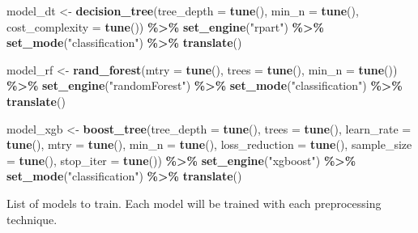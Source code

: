 \documentclass[
]{article}
\newenvironment{Shaded}{\begin{snugshade}}{\end{snugshade}}
\newcommand{\AttributeTok}[1]{\textcolor[rgb]{0.13,0.29,0.53}{#1}}
\newcommand{\FunctionTok}[1]{\textcolor[rgb]{0.13,0.29,0.53}{\textbf{#1}}}
\newcommand{\NormalTok}[1]{#1}
\newcommand{\OtherTok}[1]{\textcolor[rgb]{0.56,0.35,0.01}{#1}}
\newcommand{\SpecialCharTok}[1]{\textcolor[rgb]{0.81,0.36,0.00}{\textbf{#1}}}
\newcommand{\StringTok}[1]{\textcolor[rgb]{0.31,0.60,0.02}{#1}}
\begin{document}
\begin{Shaded}
\begin{Highlighting}[]
\NormalTok{model\_dt }\OtherTok{\textless{}{-}} \FunctionTok{decision\_tree}\NormalTok{(}\AttributeTok{tree\_depth =} \FunctionTok{tune}\NormalTok{(), }\AttributeTok{min\_n =} \FunctionTok{tune}\NormalTok{(), }\AttributeTok{cost\_complexity =} \FunctionTok{tune}\NormalTok{()) }\SpecialCharTok{\%\textgreater{}\%}
  \FunctionTok{set\_engine}\NormalTok{(}\StringTok{"rpart"}\NormalTok{) }\SpecialCharTok{\%\textgreater{}\%}
  \FunctionTok{set\_mode}\NormalTok{(}\StringTok{"classification"}\NormalTok{) }\SpecialCharTok{\%\textgreater{}\%}
  \FunctionTok{translate}\NormalTok{()}

\NormalTok{model\_rf }\OtherTok{\textless{}{-}} \FunctionTok{rand\_forest}\NormalTok{(}\AttributeTok{mtry =} \FunctionTok{tune}\NormalTok{(), }\AttributeTok{trees =} \FunctionTok{tune}\NormalTok{(), }\AttributeTok{min\_n =} \FunctionTok{tune}\NormalTok{()) }\SpecialCharTok{\%\textgreater{}\%}
  \FunctionTok{set\_engine}\NormalTok{(}\StringTok{"randomForest"}\NormalTok{) }\SpecialCharTok{\%\textgreater{}\%} 
  \FunctionTok{set\_mode}\NormalTok{(}\StringTok{"classification"}\NormalTok{) }\SpecialCharTok{\%\textgreater{}\%} 
  \FunctionTok{translate}\NormalTok{()}

\NormalTok{model\_xgb }\OtherTok{\textless{}{-}} \FunctionTok{boost\_tree}\NormalTok{(}\AttributeTok{tree\_depth =} \FunctionTok{tune}\NormalTok{(),}
                        \AttributeTok{trees =} \FunctionTok{tune}\NormalTok{(),}
                        \AttributeTok{learn\_rate =} \FunctionTok{tune}\NormalTok{(),}
                        \AttributeTok{mtry =} \FunctionTok{tune}\NormalTok{(),}
                        \AttributeTok{min\_n =} \FunctionTok{tune}\NormalTok{(),}
                        \AttributeTok{loss\_reduction =} \FunctionTok{tune}\NormalTok{(),}
                        \AttributeTok{sample\_size =} \FunctionTok{tune}\NormalTok{(),}
                        \AttributeTok{stop\_iter =} \FunctionTok{tune}\NormalTok{()) }\SpecialCharTok{\%\textgreater{}\%}
  \FunctionTok{set\_engine}\NormalTok{(}\StringTok{"xgboost"}\NormalTok{) }\SpecialCharTok{\%\textgreater{}\%}
  \FunctionTok{set\_mode}\NormalTok{(}\StringTok{"classification"}\NormalTok{) }\SpecialCharTok{\%\textgreater{}\%}
  \FunctionTok{translate}\NormalTok{()}
\end{Highlighting}
\end{Shaded}

List of models to train. Each model will be trained with each
preprocessing technique.
\end{document}
